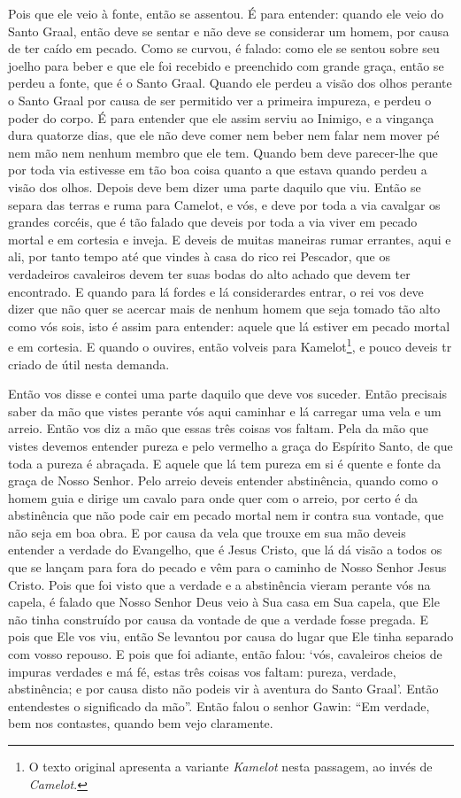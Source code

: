 Pois que ele veio à fonte, então se assentou. É para entender: quando ele veio
do Santo Graal, então deve se sentar e não deve se considerar um homem, por
causa de ter caído em pecado. Como se curvou, é falado: como ele se sentou
sobre seu joelho para beber e que ele foi recebido e preenchido com grande
graça, então se perdeu a fonte, que é o Santo Graal. Quando ele perdeu a visão
dos olhos perante o Santo Graal por causa de ser permitido ver a primeira
impureza, e perdeu o poder do corpo. É para entender que ele assim serviu ao
Inimigo, e a vingança dura quatorze dias, que ele não deve comer nem beber nem
falar nem mover pé nem mão nem nenhum membro que ele tem. Quando bem deve
parecer-lhe que por toda via estivesse em tão boa coisa quanto a que estava
quando perdeu a visão dos olhos. Depois deve bem dizer uma parte daquilo que
viu. Então se separa das terras e ruma para Camelot, e vós, e deve por toda a
via cavalgar os grandes corcéis, que é tão falado que deveis por toda a via
viver em pecado mortal e em cortesia e inveja. E deveis de muitas maneiras
rumar errantes, aqui e ali, por tanto tempo até que vindes à casa do rico rei
Pescador, que os verdadeiros cavaleiros devem ter suas bodas do alto achado que
devem ter encontrado. E quando para lá fordes e lá considerardes entrar, o rei
vos deve dizer que não quer se acercar mais de nenhum homem que seja tomado tão
alto como vós sois, isto é assim para entender: aquele que lá estiver em pecado
mortal e em cortesia. E quando o ouvires, então volveis para Kamelot\footnote{
O texto original apresenta a variante \textit{Kamelot} nesta passagem, ao invés
de \textit{Camelot}.},  e pouco deveis tr criado de útil nesta demanda. 

 Então vos disse e contei uma parte daquilo que deve vos suceder. Então
precisais saber da mão que vistes perante vós aqui caminhar e lá carregar uma
vela e um arreio. Então vos diz a mão que essas três coisas vos faltam. Pela da
mão que vistes devemos entender pureza e pelo vermelho a graça do Espírito
Santo, de que toda a pureza é abraçada. E aquele que lá tem pureza em si é
quente e fonte da graça de Nosso Senhor. Pelo arreio deveis entender
abstinência, quando como o homem guia e dirige um cavalo para onde quer com o
arreio, por certo é da abstinência que não pode cair em pecado mortal nem ir
contra sua vontade, que não seja em boa obra. E por causa da vela que trouxe em
sua mão deveis entender a verdade do Evangelho, que é Jesus Cristo, que lá dá
visão a todos os que se lançam para fora do pecado e vêm para o caminho de
Nosso Senhor Jesus Cristo. Pois que foi visto que a verdade e a abstinência
vieram perante vós na capela, é falado que Nosso Senhor Deus veio à Sua casa em
Sua capela, que Ele não tinha construído por causa da vontade de que a verdade
fosse pregada. E pois que Ele vos viu, então Se levantou por causa do lugar que
Ele tinha separado com vosso repouso. E pois que foi adiante, então falou:
‘vós, cavaleiros cheios de impuras verdades e má fé, estas três coisas vos
faltam: pureza, verdade, abstinência; e por causa disto não podeis vir à
aventura do Santo Graal’. Então entendestes o significado da mão”. 
Então falou o senhor Gawin: “Em verdade, bem nos contastes, quando
bem vejo claramente.

